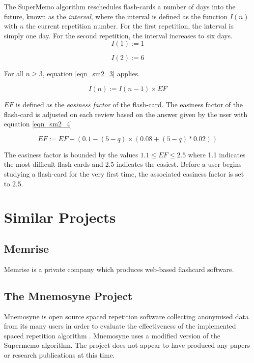 The SuperMemo algorithm reschedules flash-cards a number of days into the future, known
as the \textit{interval}, where the interval is defined as the function $I(n)$ with $n$ the
current repetition number. For the first repetition, the interval is simply one day.
For the second repetition, the interval increases to six days. 
\begin{equation}
I(1) := 1
\end{equation}

\begin{equation}
I(2) := 6
\end{equation}

For all $n \geq 3$, equation \ref{eqn_sm2_3} applies.

\begin{equation}
\label{eqn_sm2_3}
I(n) := I(n-1) \times EF
\end{equation}

$EF$ is defined as the \textit{easiness factor} of the flash-card. The easiness factor
of the flash-card is adjusted on each review based on the answer given by the user with
equation \ref{eqn_sm2_4}

\begin{equation}
\label{eqn_sm2_4}
EF := EF + (0.1 - (5 - q) \times (0.08 + (5 - q) * 0.02))
\end{equation}

The easiness factor is bounded by the values $1.1 \leq EF \leq 2.5$ where 1.1 indicates
the most difficult flash-cards and 2.5 indicates the easiest. Before a user begins studying a
flash-card for the very first time, the associated easiness factor is set to 2.5.

\section{Similar Projects} \label{background_similarprojects}
\subsection*{Memrise}
Memrise is a private company which produces web-based flashcard software.

\subsection*{The Mnemosyne Project}
Mnemosyne is open source spaced repetition software collecting anonymised data from its many users in order
to evaluate the effectiveness of the implemented spaced repetition algorithm \cite{peter_bienstman_principles_2012}.
Mnemosyne uses a modified version of the Supermemo algorithm.
The project does not appear to have produced any papers or research publications at this time.

